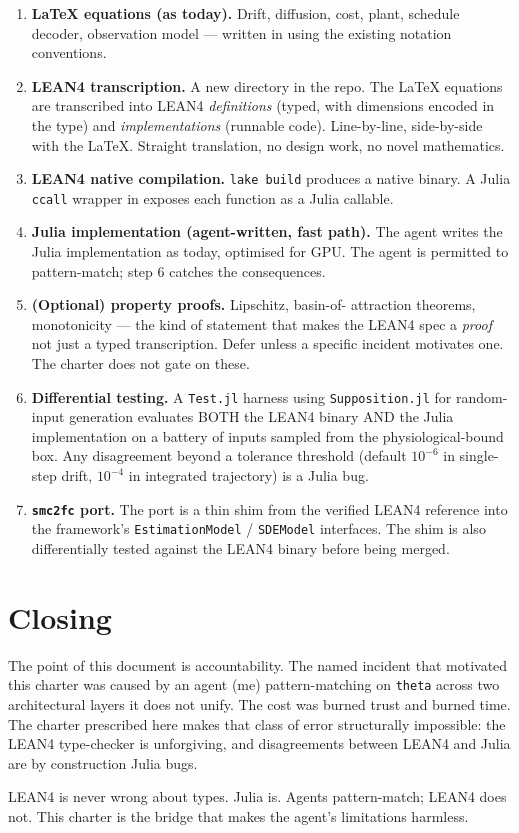 \documentclass[11pt,a4paper]{article}
\begin{document}
\begin{enumerate}
\item \textbf{LaTeX equations (as today).} Drift, diffusion, cost,
  plant, schedule decoder, observation model --- written in
   using the existing notation
  conventions.
\item \textbf{LEAN4 transcription.} A new  directory in
  the repo. The LaTeX equations are transcribed into LEAN4
  \emph{definitions} (typed, with dimensions encoded in the type)
  and \emph{implementations} (runnable code). Line-by-line,
  side-by-side with the LaTeX. Straight translation, no design
  work, no novel mathematics.
\item \textbf{LEAN4 native compilation.} \texttt{lake build}
  produces a native binary. A Julia \texttt{ccall} wrapper in
   exposes each function as a Julia
  callable.
\item \textbf{Julia implementation (agent-written, fast path).}
  The agent writes the Julia implementation as today,
  optimised for GPU. The agent is permitted to pattern-match;
  step 6 catches the consequences.
\item \textbf{(Optional) property proofs.} Lipschitz, basin-of-
  attraction theorems, monotonicity --- the kind of statement that
  makes the LEAN4 spec a \emph{proof} not just a typed transcription.
  Defer unless a specific incident motivates one. The charter does
  not gate on these.
\item \textbf{Differential testing.} A \texttt{Test.jl} harness using
  \texttt{Supposition.jl} for random-input generation evaluates BOTH the
  LEAN4 binary AND the Julia implementation on a battery of inputs
  sampled from the physiological-bound box. Any disagreement beyond
  a tolerance threshold (default $10^{-6}$ in single-step drift,
  $10^{-4}$ in integrated trajectory) is a Julia bug.
\item \textbf{\texttt{smc2fc} port.} The port is a thin shim from
  the verified LEAN4 reference into the framework's
  \texttt{EstimationModel} / \texttt{SDEModel} interfaces. The
  shim is also differentially tested against the LEAN4 binary
  before being merged.
\end{enumerate}

\section{Closing}

The point of this document is accountability. The named incident
that motivated this charter was caused by an agent (me)
pattern-matching on \texttt{theta} across two architectural
layers it does not unify. The cost was burned trust and burned
time. The charter prescribed here makes that class of error
structurally impossible: the LEAN4 type-checker is unforgiving,
and disagreements between LEAN4 and Julia are by construction
Julia bugs.

LEAN4 is never wrong about types. Julia is. Agents pattern-match;
LEAN4 does not. This charter is the bridge that makes the agent's
limitations harmless.
\end{document}
